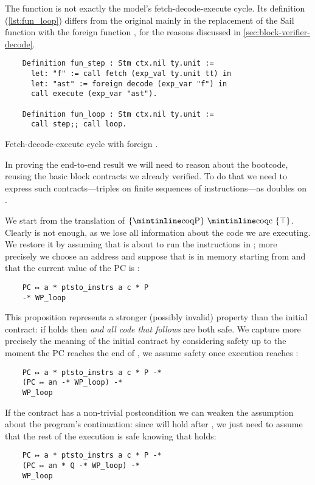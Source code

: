 The  function is not exactly the model's fetch-decode-execute cycle. Its definition (\cref{lst:fun_loop}) differs from the original mainly in the replacement of the  Sail function with the foreign function , for the reasons discussed in \cref{sec:block-verifier-decode}.

\begin{listing}[tb]
  \begin{verbatim}
    Definition fun_step : Stm ctx.nil ty.unit :=
      let: "f" := call fetch (exp_val ty.unit tt) in
      let: "ast" := foreign decode (exp_var "f") in
      call execute (exp_var "ast").

    Definition fun_loop : Stm ctx.nil ty.unit :=
      call step;; call loop.
  \end{verbatim}
  \caption{Fetch-decode-execute cycle with foreign .}
  \label{lst:fun_loop}
\end{listing}

In proving the end-to-end result we will need to reason about the bootcode, reusing the basic block contracts we already verified. To do that we need to express such contracts---triples on finite sequences of instructions---as doubles on .

We start from the translation of \(\hoare{\text{\coq{P}}}{\text{\coq{c}}}{\top}\). Clearly  is not enough, as we lose all information about the code we are executing. We restore it by assuming that  is about to run the instructions in ; more precisely we choose an address  and suppose that  is in memory starting from  and that the current value of the PC is :
\begin{verbatim}
    PC ↦ a * ptsto_instrs a c * P
    -* WP_loop
\end{verbatim}
This proposition represents a stronger (possibly invalid) property than the initial contract: if  holds then  \emph{and all code that follows} are both safe. We capture more precisely the meaning of the initial contract by considering safety up to the moment the PC reaches the end of , \ie we assume safety once execution reaches :
\begin{verbatim}
    PC ↦ a * ptsto_instrs a c * P -*
    (PC ↦ an -* WP_loop) -*
    WP_loop
  \end{verbatim}

\pagebreak\noindent
If the contract has a non-trivial postcondition  we can weaken the assumption about the program's continuation: since  will hold after , we just need to assume that the rest of the execution is safe knowing that  holds:
\begin{verbatim}
    PC ↦ a * ptsto_instrs a c * P -*
    (PC ↦ an * Q -* WP_loop) -*
    WP_loop
\end{verbatim}

